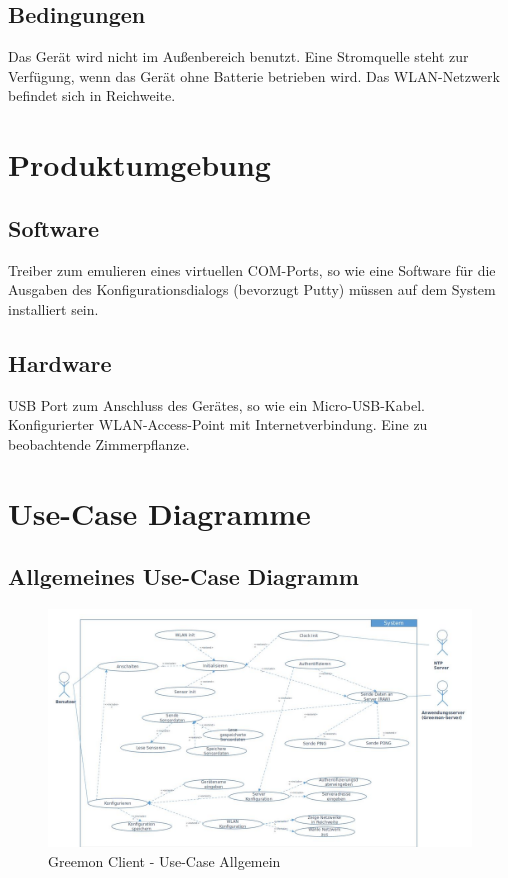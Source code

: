 \documentclass[pointlessnumbers]{scrartcl}
\begin{document}
\subsection{Bedingungen}
    Das Gerät wird nicht im Außenbereich benutzt. Eine Stromquelle steht zur Verfügung, wenn das Gerät ohne Batterie betrieben wird. Das WLAN-Netzwerk befindet sich in Reichweite.
\section{Produktumgebung}
\subsection{Software}
    Treiber zum emulieren eines virtuellen COM-Ports, so wie eine Software für die Ausgaben des Konfigurationsdialogs (bevorzugt Putty) müssen auf dem System installiert sein.
\subsection{Hardware}
    USB Port zum Anschluss des Gerätes, so wie ein Micro-USB-Kabel. Konfigurierter WLAN-Access-Point mit Internetverbindung. Eine zu beobachtende Zimmerpflanze.





\section{Use-Case Diagramme}
\subsection{Allgemeines Use-Case Diagramm}
\begin{figure}[htbp] 
  \centering
     \includegraphics[width=1\textwidth]{images/usecase_client_allgemein.jpg}
  \caption{Greemon Client - Use-Case Allgemein}
  \label{fig:usecase_client_general}
\end{figure}
\end{document}
